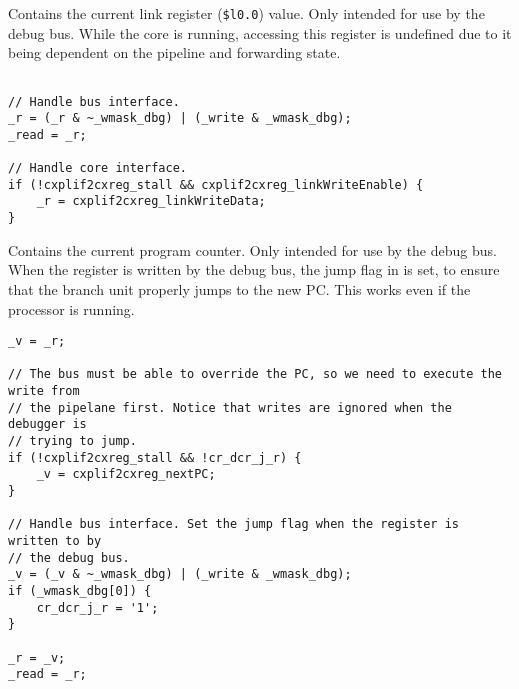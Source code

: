 Contains the current link register (\texttt{\$l0.0}) value. Only intended for
use by the debug bus. While the core is running, accessing this register is
undefined due to it being dependent on the pipeline and forwarding state.

\declaration{}
\implementation{}
\begin{lstlisting}

// Handle bus interface.
_r = (_r & ~_wmask_dbg) | (_write & _wmask_dbg);
_read = _r;

// Handle core interface.
if (!cxplif2cxreg_stall && cxplif2cxreg_linkWriteEnable) {
    _r = cxplif2cxreg_linkWriteData;
}

\end{lstlisting}


Contains the current program counter. Only intended for use by the debug bus.
When the register is written by the debug bus, the jump flag in  is
set, to ensure that the branch unit properly jumps to the new PC. This works
even if the processor is running.

\declaration{}
\implementation{}
\begin{lstlisting}
_v = _r;

// The bus must be able to override the PC, so we need to execute the write from
// the pipelane first. Notice that writes are ignored when the debugger is
// trying to jump.
if (!cxplif2cxreg_stall && !cr_dcr_j_r) {
    _v = cxplif2cxreg_nextPC;
}

// Handle bus interface. Set the jump flag when the register is written to by
// the debug bus.
_v = (_v & ~_wmask_dbg) | (_write & _wmask_dbg);
if (_wmask_dbg[0]) {
    cr_dcr_j_r = '1';
}

_r = _v;
_read = _r;

\end{lstlisting}


